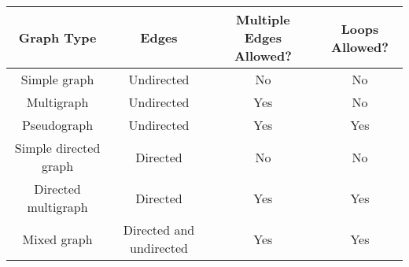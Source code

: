 \documentclass{exam}
\begin{document}
\vspace{5mm}
\begin{tabular}{|c|c|c|c|}
\hline
Graph Type            & Edges         & Multiple Edges Allowed? & Loops Allowed? \\
\hline
Simple graph          & Undirected    & No                      & No             \\
Multigraph            & Undirected    & Yes                     & No             \\
Pseudograph           & Undirected    & Yes                     & Yes            \\
Simple directed graph & Directed      & No                      & No             \\
Directed multigraph   & Directed      & Yes                     & Yes            \\
Mixed graph           & Directed and undirected & Yes          & Yes            \\
\hline
\end{tabular}
\vspace{5mm}
\end{document}
